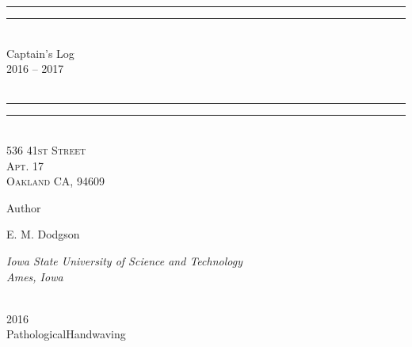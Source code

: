 \newcommand*{\titleGP}{\begingroup %
\centering %
\vspace*{\baselineskip} %

\rule{\textwidth}{1.6pt}\vspace*{-\baselineskip}\vspace*{2pt} %
\rule{\textwidth}{0.4pt}\\[\baselineskip] %

{\LARGE Captain's Log\\ 2016 -- 2017 \\[0.3\baselineskip] }\\[0.2\baselineskip] %

\rule{\textwidth}{0.4pt}\vspace*{-\baselineskip}\vspace{3.2pt} %
\rule{\textwidth}{1.6pt}\\[\baselineskip] %

\scshape %
536 41st Street \\ %
Apt. 17 \\ %
Oakland CA, 94609\par %

\vspace*{2\baselineskip} %

Author \\[\baselineskip]
{\Large E. M. Dodgson \\ \par} %
{\itshape Iowa State University of Science and Technology \\ Ames, Iowa \par} %

\vfill %

\plogo \\[0.3\baselineskip] %
{\scshape 2016} \\[0.3\baselineskip] %
{\large PathologicalHandwaving}\par %

\endgroup}


 

\pagestyle{empty} %

\titleGP %


